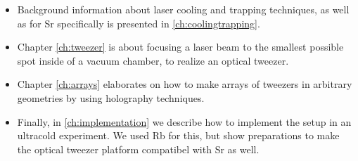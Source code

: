 \begin{itemize}
	\setlength\itemsep{-1pt}
	\item Background information about laser cooling and trapping techniques, as well as for Sr specifically is presented in \cref{ch:coolingtrapping}. 

	\item Chapter \cref{ch:tweezer} is about focusing a laser beam to the smallest possible spot inside of a vacuum chamber, to realize an optical tweezer.

	\item Chapter \ref{ch:arrays} elaborates on how to make arrays of tweezers in arbitrary geometries by using holography techniques.

	\item Finally, in \cref{ch:implementation} we describe how to implement the setup in an ultracold experiment. 
	We used Rb for this, but show preparations to make the optical tweezer platform compatibel with Sr as well.
\end{itemize}










